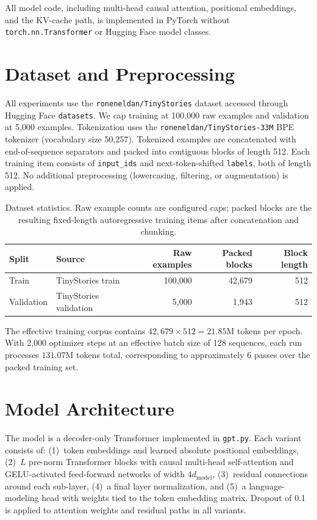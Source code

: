 \documentclass{article}
\begin{document}
All model code, including multi-head causal attention, positional embeddings, and the KV-cache path, is implemented in PyTorch without \texttt{torch.nn.Transformer} or Hugging Face model classes.

\section{Dataset and Preprocessing}

All experiments use the \texttt{roneneldan/TinyStories} dataset accessed through Hugging Face \texttt{datasets}. We cap training at 100{,}000 raw examples and validation at 5{,}000 examples. Tokenization uses the \texttt{roneneldan/TinyStories-33M} BPE tokenizer (vocabulary size 50{,}257). Tokenized examples are concatenated with end-of-sequence separators and packed into contiguous blocks of length 512. Each training item consists of \texttt{input\_ids} and next-token-shifted \texttt{labels}, both of length 512. No additional preprocessing (lowercasing, filtering, or augmentation) is applied.

\begin{table}[!tbp]
\centering
\caption{Dataset statistics. Raw example counts are configured caps; packed blocks are the resulting fixed-length autoregressive training items after concatenation and chunking.}
\label{tab:dataset}
\begin{tabular}{llrrr}
\toprule
Split & Source & Raw examples & Packed blocks & Block length \\
\midrule
Train & TinyStories train & 100{,}000 & 42{,}679 & 512 \\
Validation & TinyStories validation & 5{,}000 & 1{,}943 & 512 \\
\bottomrule
\end{tabular}
\end{table}

The effective training corpus contains $42{,}679 \times 512 = 21.85\text{M}$ tokens per epoch. With 2{,}000 optimizer steps at an effective batch size of 128 sequences, each run processes $131.07\text{M}$ tokens total, corresponding to approximately 6 passes over the packed training set.

\section{Model Architecture}

The model is a decoder-only Transformer implemented in \texttt{gpt.py}. Each variant consists of: (1)~token embeddings and learned absolute positional embeddings, (2)~$L$ pre-norm Transformer blocks with causal multi-head self-attention and GELU-activated feed-forward networks of width $4d_{\mathrm{model}}$, (3)~residual connections around each sub-layer, (4)~a final layer normalization, and (5)~a language-modeling head with weights tied to the token embedding matrix. Dropout of 0.1 is applied to attention weights and residual paths in all variants.
\end{document}
